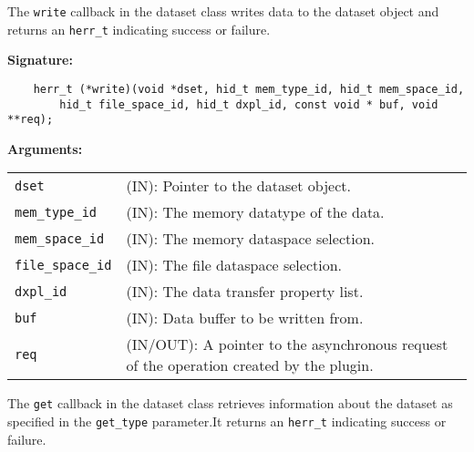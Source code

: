 The \texttt{write} callback in the dataset class writes data to
the dataset object and returns an \texttt{herr\_t} indicating success or
failure.\bigskip

\begin{mdframed}[style=bgbox]
\textbf{Signature:}
\begin{lstlisting}
    herr_t (*write)(void *dset, hid_t mem_type_id, hid_t mem_space_id, 
        hid_t file_space_id, hid_t dxpl_id, const void * buf, void **req);
\end{lstlisting}

\textbf{Arguments:}\\
\begin{tabular}{l p{10cm}}
  \texttt{dset} & (IN): Pointer to the dataset object.\\
  \texttt{mem\_type\_id} & (IN): The memory datatype of the data.\\
  \texttt{mem\_space\_id} & (IN): The memory dataspace selection.\\
  \texttt{file\_space\_id} & (IN): The file dataspace selection.\\
  \texttt{dxpl\_id} & (IN): The data transfer property list.\\
  \texttt{buf} & (IN): Data buffer to be written from.\\
  \texttt{req} & (IN/OUT): A pointer to the asynchronous request of the
  operation created by the plugin.\\
\end{tabular}
\end{mdframed}

The \texttt{get} callback in the dataset class retrieves
information about the dataset as specified in the \texttt{get\_type}
parameter.It returns an \texttt{herr\_t} indicating success or failure.\bigskip

